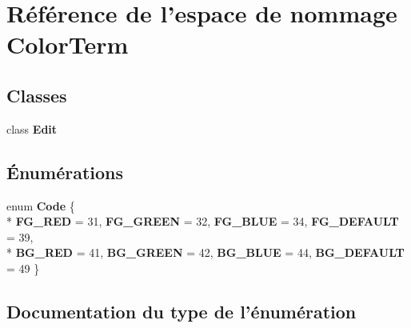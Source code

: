\section{Référence de l'espace de nommage Color\-Term}
\label{namespace_color_term}
\subsection*{Classes}
\begin{DoxyCompactItemize}
\item 
class {\bf Edit}
\end{DoxyCompactItemize}
\subsection*{Énumérations}
\begin{DoxyCompactItemize}
\item 
enum {\bf Code} \{ \\*
{\bf F\-G\-\_\-\-R\-E\-D} = 31, 
{\bf F\-G\-\_\-\-G\-R\-E\-E\-N} = 32, 
{\bf F\-G\-\_\-\-B\-L\-U\-E} = 34, 
{\bf F\-G\-\_\-\-D\-E\-F\-A\-U\-L\-T} = 39, 
\\*
{\bf B\-G\-\_\-\-R\-E\-D} = 41, 
{\bf B\-G\-\_\-\-G\-R\-E\-E\-N} = 42, 
{\bf B\-G\-\_\-\-B\-L\-U\-E} = 44, 
{\bf B\-G\-\_\-\-D\-E\-F\-A\-U\-L\-T} = 49
 \}
\end{DoxyCompactItemize}


\subsection{Documentation du type de l'énumération}
